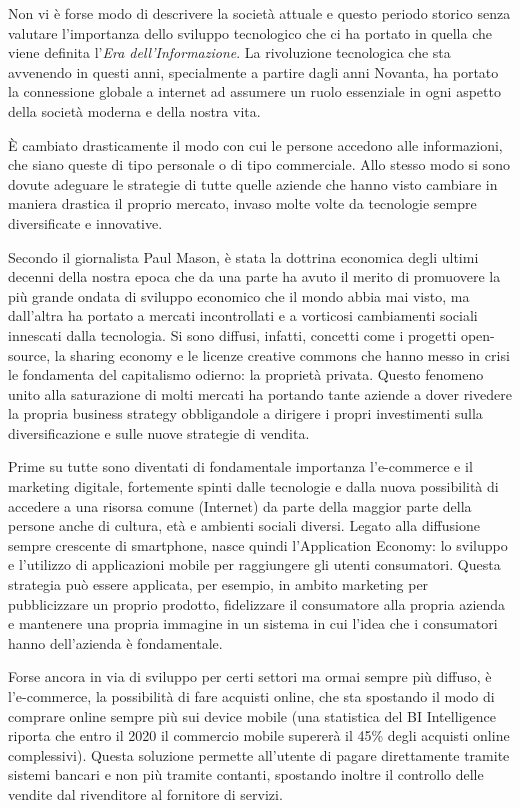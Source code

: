 Non vi è forse modo di descrivere la società attuale e questo periodo storico senza valutare l'importanza dello sviluppo tecnologico che ci ha portato in quella che viene definita l'\textit{Era dell'Informazione}.
La rivoluzione tecnologica che sta avvenendo in questi anni, specialmente a partire dagli anni Novanta, ha portato la connessione globale a internet ad assumere un ruolo essenziale in ogni aspetto della società moderna e della nostra vita.

È cambiato drasticamente il modo con cui le persone accedono alle informazioni, che siano queste di tipo personale o di tipo commerciale.
Allo stesso modo si sono dovute adeguare le strategie di tutte quelle aziende che hanno visto cambiare in maniera drastica il proprio mercato, invaso molte volte da tecnologie sempre diversificate e innovative.

Secondo il giornalista Paul Mason, è stata la dottrina economica degli ultimi decenni della nostra epoca che da una parte ha avuto il merito di promuovere la più grande ondata di sviluppo economico che il mondo abbia mai visto, ma dall’altra ha portato a mercati incontrollati e a vorticosi cambiamenti sociali innescati dalla tecnologia.
Si sono diffusi, infatti, concetti come i progetti open-source, la sharing economy e le licenze creative commons che hanno messo in crisi le fondamenta del capitalismo odierno: la proprietà privata. 
Questo fenomeno unito alla saturazione di molti mercati ha portando tante aziende a dover rivedere la propria business strategy obbligandole a dirigere i propri investimenti sulla diversificazione e sulle nuove strategie di vendita. \autocite{POSTCAPITALISMO}

Prime su tutte sono diventati di fondamentale importanza l'e-commerce e il marketing digitale, fortemente spinti dalle tecnologie e dalla nuova possibilità di accedere a una risorsa comune (Internet) da parte della maggior parte della persone anche di cultura, età e ambienti sociali diversi.
Legato alla diffusione sempre crescente di smartphone, nasce quindi l'Application Economy: lo sviluppo e l'utilizzo di applicazioni mobile per raggiungere gli utenti consumatori.
Questa strategia può essere applicata, per esempio, in ambito marketing per pubblicizzare un proprio prodotto, fidelizzare il consumatore alla propria azienda e mantenere una propria immagine in un sistema in cui l'idea che i consumatori hanno dell'azienda è fondamentale.

Forse ancora in via di sviluppo per certi settori ma ormai sempre più diffuso, è l'e-commerce, la possibilità di fare acquisti online, che sta spostando il modo di comprare online sempre più sui device mobile (una statistica del BI Intelligence riporta che entro il 2020 il commercio mobile supererà il 45\% degli acquisti online complessivi).
Questa soluzione permette all'utente di pagare direttamente tramite sistemi bancari e non più tramite contanti, spostando inoltre il controllo delle vendite dal rivenditore al fornitore di servizi.

